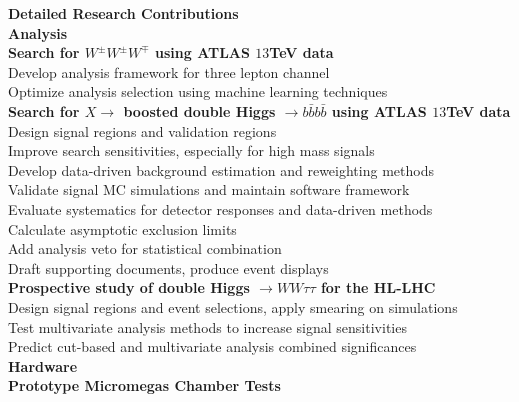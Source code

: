 \documentclass[letterpaper,11pt,oneside]{article}
\begin{document}
\newpage
\raggedright
\normalsize
\textbf{\Large{Detailed Research Contributions}} \\
\vspace{0.4cm}
 \textbf{Analysis}\\
	\vspace{0.1cm}
 	\quad \textbf{Search for $W^{\pm} W^{\pm} W^{\mp}$ using ATLAS $13$TeV data}\\
	\quad \quad Develop analysis framework for three lepton channel \\
	\quad \quad Optimize analysis selection using machine learning techniques \\
	\vspace{0.1cm}
 	\quad \textbf{Search for $X \to$ boosted double Higgs $ \to b\bar{b}b\bar{b}$ using ATLAS $13$TeV data}\\
	\quad \quad Design signal regions and validation regions \\
	\quad \quad Improve search sensitivities, especially for high mass signals \\
	\quad \quad Develop data-driven background estimation and reweighting methods \\
	\quad \quad Validate signal MC simulations and maintain software framework  \\
	\quad \quad Evaluate systematics for detector responses and data-driven methods \\
	\quad \quad Calculate asymptotic exclusion limits \\
	\quad \quad Add analysis veto for statistical combination \\
	\quad \quad Draft supporting documents, produce event displays \\
	\vspace{0.1cm}
 	\quad \textbf{Prospective study of double Higgs $\to WW\tau\tau$ for the HL-LHC}\\
	\quad \quad  Design signal regions and event selections, apply smearing on simulations \\
	\quad \quad  Test multivariate analysis methods to increase signal sensitivities \\
	\quad \quad  Predict cut-based and multivariate analysis combined significances \\
	\vspace{0.4cm}
 \textbf{Hardware}\\
	\vspace{0.1cm}
 	\quad \textbf{Prototype Micromegas Chamber Tests}\\
\end{document}
